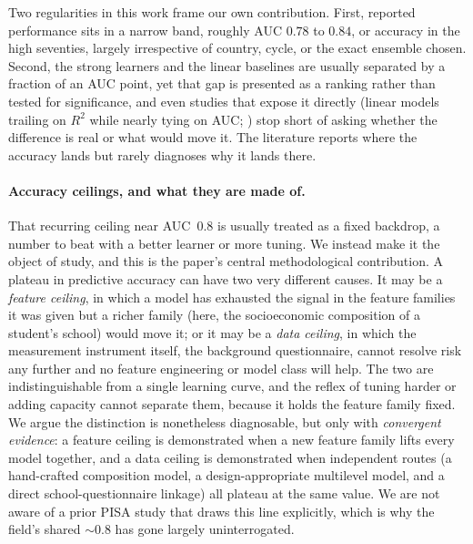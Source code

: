 Two regularities in this work frame our own contribution. First, reported performance
sits in a narrow band, roughly AUC $0.78$ to $0.84$, or accuracy in the high seventies,
largely irrespective of country, cycle, or the exact ensemble chosen. Second, the
strong learners and the linear baselines are usually separated by a fraction of an AUC
point, yet that gap is presented as a ranking rather than tested for significance, and
even studies that expose it directly (linear models trailing on $R^2$ while nearly
tying on AUC; \citealp{djekourmane2026east}) stop short of asking whether the difference is
real or what would move it. The literature reports where the accuracy lands but rarely
diagnoses why it lands there.

\paragraph{Accuracy ceilings, and what they are made of.}
That recurring ceiling near AUC~$0.8$ is usually treated as a fixed backdrop, a number
to beat with a better learner or more tuning. We instead make it the object of study,
and this is the paper's central methodological contribution. A plateau in predictive
accuracy can have two very different causes. It may be a \emph{feature ceiling}, in
which a model has exhausted the signal in the feature families it was given but a richer
family (here, the socioeconomic composition of a student's school) would move it; or it
may be a \emph{data ceiling}, in which the measurement instrument itself, the background
questionnaire, cannot resolve risk any further and no feature engineering or model class
will help. The two are indistinguishable from a single learning curve, and the reflex
of tuning harder or adding capacity cannot separate them, because it holds the feature
family fixed. We argue the distinction is nonetheless diagnosable, but only with
\emph{convergent evidence}: a feature ceiling is demonstrated when a new feature family
lifts every model together, and a data ceiling is demonstrated when independent routes
(a hand-crafted composition model, a design-appropriate multilevel model, and a direct
school-questionnaire linkage) all plateau at the same value. We are not aware of a prior
PISA study that draws this line explicitly, which is why the field's shared $\sim0.8$
has gone largely uninterrogated.

